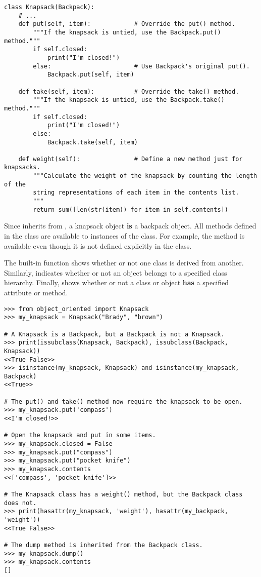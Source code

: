 \begin{lstlisting}
class Knapsack(Backpack):
    # ...
    def put(self, item):            # Override the put() method.
        """If the knapsack is untied, use the Backpack.put() method."""
        if self.closed:
            print("I'm closed!")
        else:                       # Use Backpack's original put().
            Backpack.put(self, item)

    def take(self, item):           # Override the take() method.
        """If the knapsack is untied, use the Backpack.take() method."""
        if self.closed:
            print("I'm closed!")
        else:
            Backpack.take(self, item)

    def weight(self):               # Define a new method just for knapsacks.
        """Calculate the weight of the knapsack by counting the length of the
        string representations of each item in the contents list.
        """
        return sum([len(str(item)) for item in self.contents])
\end{lstlisting}

Since  inherits from , a knapsack object \textbf{is} a backpack object.
All methods defined in the  class are available to instances of the  class.
For example, the  method is available even though it is not defined explicitly in the  class.

The built-in function  shows whether or not one class is derived from another.
Similarly,  indicates whether or not an object belongs to a specified class hierarchy.
Finally,  shows whether or not a class or object \textbf{has} a specified attribute or method.

\begin{lstlisting}
>>> from object_oriented import Knapsack
>>> my_knapsack = Knapsack("Brady", "brown")

# A Knapsack is a Backpack, but a Backpack is not a Knapsack.
>>> print(issubclass(Knapsack, Backpack), issubclass(Backpack, Knapsack))
<<True False>>
>>> isinstance(my_knapsack, Knapsack) and isinstance(my_knapsack, Backpack)
<<True>>

# The put() and take() method now require the knapsack to be open.
>>> my_knapsack.put('compass')
<<I'm closed!>>

# Open the knapsack and put in some items.
>>> my_knapsack.closed = False
>>> my_knapsack.put("compass")
>>> my_knapsack.put("pocket knife")
>>> my_knapsack.contents
<<['compass', 'pocket knife']>>

# The Knapsack class has a weight() method, but the Backpack class does not.
>>> print(hasattr(my_knapsack, 'weight'), hasattr(my_backpack, 'weight'))
<<True False>>

# The dump method is inherited from the Backpack class.
>>> my_knapsack.dump()
>>> my_knapsack.contents
[]
\end{lstlisting}

